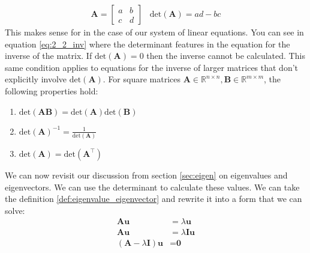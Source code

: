 \documentclass[a4paper,12pt]{book}
\newcommand{\matrx}[1]{\bm{#1}}
\newcommand{\vectr}[1]{\textbf{#1}}
\newcommand{\real}{\mathbb{R}}
\newcommand{\dett}[1]{\text{det}(\matrx{#1})}
\begin{document}
	\begin{align}
		\matrx{A} = \begin{bmatrix}
			a & b \\
			c & d
		\end{bmatrix}
		\hspace{10pt}
		\dett{A} = ad - bc
	\end{align}
	This makes sense for in the case of our system of linear equations. You can see in equation \ref{eq:2_2_inv} where the determinant features in the equation for the inverse of the matrix. If $ \dett{A} = 0$ then the inverse cannot be calculated. This same condition applies to equations for the inverse of larger matrices that don't explicitly involve $ \dett{A} $. For square matrices $ \matrx{A} \in \real^{n \times n}, \matrx{B} \in \real^{m \times m} $, the following properties hold:
	
	\begin{enumerate}
		\item $ \dett{AB} = \dett{A}\dett{B} $
		\item $ \dett{A}^{-1} = \frac{1}{\dett{A}} $
		\item $ \dett{A} = \dett{A^{\top}}$
	\end{enumerate}

	We can now revisit our discussion from section \ref{sec:eigen} on eigenvalues and eigenvectors. We can use the determinant to calculate these values. We can take the definition \ref{def:eigenvalue_eigenvector} and rewrite it into a form that we can solve:
	\begin{align}
		\matrx{A} \vectr{u} &= \lambda \vectr{u} \\
		\matrx{A} \vectr{u} &= \lambda \matrx{I} \vectr{u} \\
		(\matrx{A} - \lambda \matrx{I}) \vectr{u} &= \vectr{0} 
		\label{eq:proof_eigen_det}
	\end{align}
	
\end{document}
